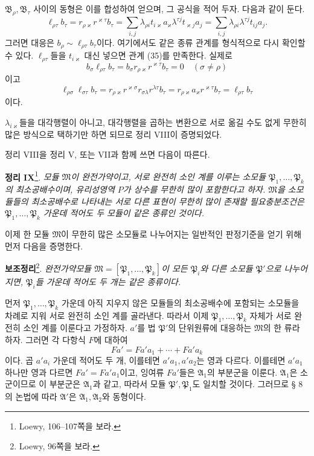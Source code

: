 \(\mathfrak B_\rho,\mathfrak B_\tau\) 사이의 동형은 이를 합성하여 얻으며, 그 공식을 적어 두자. 다음과 같이 둔다.
\[
 \ell_{\rho\tau}b_\tau
 =r_{\rho\varkappa}r^{\varkappa\tau}b_\tau
 =\sum_{i,j}\lambda_{\rho i}t_{i\varkappa}a_\varkappa
  \lambda^{\tau j}t_{\varkappa j}a_j
 =\sum_{i,j}\lambda_{\rho i}\lambda^{\tau j}t_{ij}a_j.
\]
그러면 대응은 \(b_\rho\sim\ell_{\rho\tau}b_\tau\)이다. 여기에서도 같은 종류 관계를 형식적으로 다시 확인할 수 있다. \(\ell_{\rho\tau}\)들을 \(t_{i\varkappa}\) 대신 넣으면 관계 (35)를 만족한다. 실제로
\[
 b_\sigma\ell_{\rho\tau}b_\tau
 =b_\sigma r_{\rho\varkappa}r^{\varkappa\tau}b_\tau
 =0\quad(\sigma\ne\rho)
\]
이고
\[
 \ell_{\rho\sigma}\ell_{\sigma\tau}b_\tau
 =r_{\rho\varkappa}r^{\varkappa\sigma}
  r_{\sigma\lambda}r^{\lambda\tau}b_\tau
 =r_{\rho\varkappa}a_\varkappa r^{\varkappa\tau}b_\tau
 =\ell_{\rho\tau}b_\tau
\]
이다.

\(\lambda_{i\varkappa}\)들을 대각행렬이 아니고, 대각행렬을 곱하는 변환으로 서로 옮길 수도 없게 무한히 많은 방식으로 택하기만 하면 되므로 정리 VIII이 증명되었다.

정리 VIII을 정리 V, 또는 VII과 함께 쓰면 다음이 따른다.

\textbf{정리 IX}\footnote{Loewy, 106--107쪽을 보라.}. \emph{모듈 \(\mathfrak M\)이 완전가약이고, 서로 완전히 소인 계를 이루는 소모듈 \(\mathfrak P_1,\ldots,\mathfrak P_k\)의 최소공배수이며, 유리성영역 \(P\)가 상수를 무한히 많이 포함한다고 하자. \(\mathfrak M\)을 소모듈들의 최소공배수로 나타내는 서로 다른 표현이 무한히 많이 존재할 필요충분조건은 \(\mathfrak P_1,\ldots,\mathfrak P_k\) 가운데 적어도 두 모듈이 같은 종류인 것이다.}

이제 한 모듈 \(\mathfrak M\)이 무한히 많은 소모듈로 나누어지는 일반적인 판정기준을 얻기 위해 먼저 다음을 증명한다.

\textbf{보조정리}\footnote{Loewy, 96쪽을 보라.}. \emph{완전가약모듈 \(\mathfrak M=[\mathfrak P_1,\ldots,\mathfrak P_k]\)이 모든 \(\mathfrak P_i\)와 다른 소모듈 \(\mathfrak P'\)으로 나누어지면, \(\mathfrak P_i\)들 가운데 적어도 두 개는 같은 종류이다.}

먼저 \(\mathfrak P_1,\ldots,\mathfrak P_k\) 가운데 아직 지우지 않은 모듈들의 최소공배수에 포함되는 소모듈을 차례로 지워 서로 완전히 소인 계를 골라낸다. 따라서 이제 \(\mathfrak P_1,\ldots,\mathfrak P_k\) 자체가 서로 완전히 소인 계를 이룬다고 가정하자. \(a'\)를 법 \(\mathfrak P'\)의 단위원류에 대응하는 \(\mathfrak M\)의 한 류라 하자. 그러면 각 다항식 \(F\)에 대하여
\[
 Fa'=Fa'a_1+\cdots+Fa'a_k
\]
이다. 곱 \(a'a_i\) 가운데 적어도 두 개, 이를테면 \(a'a_1,a'a_2\)는 영과 다르다. 이를테면 \(a'a_1\) 하나만 영과 다르면 \(Fa'=Fa'a_1\)이고, 잉여류 \(Fa'\)들은 \(\mathfrak A_1\)의 부분군을 이룬다. \(\mathfrak A_1\)은 소군이므로 이 부분군은 \(\mathfrak A_1\)과 같고, 따라서 모듈 \(\mathfrak P',\mathfrak P_1\)도 일치할 것이다. 그러므로 § 8의 논법에 따라 \(\mathfrak A'\)은 \(\mathfrak A_1,\mathfrak A_2\)와 동형이다.

